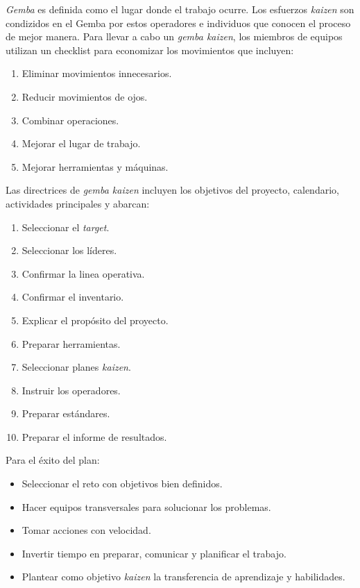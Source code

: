 \documentclass[]{article}
\begin{document}
\textit{Gemba} es definida como el lugar donde el trabajo ocurre. Los esfuerzos \textit{kaizen} son condizidos en el Gemba por estos operadores e individuos que conocen el proceso de mejor manera. Para llevar a cabo un \textit{gemba kaizen}, los miembros de equipos utilizan un checklist para economizar los movimientos que incluyen:

\begin{enumerate}
	\item Eliminar movimientos innecesarios.
	\item Reducir movimientos de ojos.
	\item Combinar operaciones.
	\item Mejorar el lugar de trabajo.
	\item Mejorar herramientas y máquinas.
\end{enumerate}

Las directrices de \textit{gemba kaizen} incluyen los objetivos del proyecto, calendario, actividades principales y abarcan:
\begin{enumerate}
	\item Seleccionar el \textit{target}.
	\item Seleccionar los líderes.
	\item Confirmar la linea operativa.
	\item Confirmar el inventario.
	\item Explicar el propósito del proyecto.
	\item Preparar herramientas.
	\item Seleccionar planes \textit{kaizen}.
	\item Instruir los operadores.
	\item Preparar estándares.
	\item Preparar el informe de resultados.
\end{enumerate}

Para el éxito del plan:
\begin{itemize}
	\item Seleccionar el reto con objetivos bien definidos.
	\item Hacer equipos transversales para solucionar los problemas.
	\item Tomar acciones con velocidad.
	\item Invertir tiempo en preparar, comunicar y planificar el trabajo.
	\item Plantear como objetivo \textit{kaizen} la transferencia de aprendizaje y habilidades.
\end{itemize}
\end{document}
